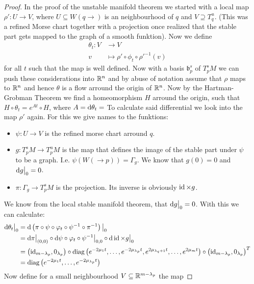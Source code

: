 \begin{proof}
	In the proof of the unstable manifold theorem we started with a local map $\rho': U\to V$, where $U\subseteq W(q\to)$ is an neighbourhood of $q$ and $V\supseteq T^u_q$. (This was a refined Morse chart together with a projection once realized that the stable part gets mapped to the graph of a smooth funktion). Now we define
	\begin{align*}
		\theta_t:V&\to V\\
		v&\mapsto \rho' \circ \phi_t \circ \rho'^{-1}(v)
	\end{align*} for all $t$ such that the map is well defined. Now with a basis $\mathfrak{b}^s_p$ of $T^s_pM$ we can push these considerations into $\mathbb{R}^n$ and by abuse of notation assume that $\rho$ maps to $\mathbb{R}^n$ and hence $\theta$ is a flow arround the origin of $\mathbb{R}^n$. Now by the Hartman-Grobman Theorem we find a homeomorphism $H$ arround the origin, such that $H\circ \theta_t= e^{At} \circ H$, where $A=\mathop{}\!\mathrm{d} \theta_t=$ To calculate said differential we look into the map $\rho'$ again. For this we give names to the funktions:
	\begin{itemize}
		\item $\psi: U \to V$ is the refined morse chart arround $q$.
		\item $g: T^s_pM\to T^u_pM$ is the map that defines the image of the stable part under $\psi$ to be a graph. I.e. $\psi\left(W(\to p)\right)=\Gamma_{g}$. We know that $g(0)=0$ and $\mathop{}\!\mathrm{d} g\big|_0=0$.
		\item $\pi: \Gamma_g\to T^s_pM$ is the projection. Its inverse is obviously $\operatorname{\mathrm{id}}\times g$.
	\end{itemize}
	We know from the local stable manifold theorem, that $\mathop{}\!\mathrm{d} g \big|_0=0$. With this we can calculate:
	\begin{align*}
		\mathop{}\!\mathrm{d} \theta_t\big|_0
		&= \mathop{}\!\mathrm{d} \left(\pi \circ \psi \circ \varphi_t\circ \psi^{-1}\circ \pi^{-1} \right)\big|_0\\
		&= \mathop{}\!\mathrm{d} \pi \big|_{(0,0)} \circ \mathop{}\!\mathrm{d} \psi \circ \varphi_t\circ \psi^{-1} \big|_{0,0}\circ \mathop{}\!\mathrm{d} \operatorname{\mathrm{id}}\times g \big|_0\\
		&= \left(\operatorname{\mathrm{id}}_{m-\lambda_p},0_{\lambda_p}\right) \circ \mathrm{diag}\left(e^{-2\mu_1 t},\dots,e^{-2\mu_{\lambda_p} t},e^{2\mu_{\lambda_q+1} t},\dots ,e^{2\mu_m t} \right) \circ \left(\operatorname{\mathrm{id}}_{m-\lambda_p},0_{\lambda_p}\right)^T\\
		&= \mathrm{diag}\left(e^{-2\mu_1 t},\dots,e^{-2\mu_{\lambda_p} t} \right)
	\end{align*} Now define for a small neighbourhood $V\subseteq \mathbb{R}^{m-\lambda_p}$ the map

\end{proof}
